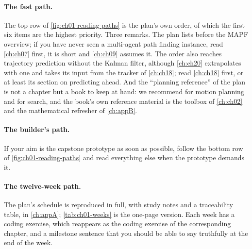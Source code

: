 \paragraph{The fast path.}
The top row of \cref{fig:ch01-reading-paths} is the plan's own order, of which the
first six items are the highest priority. Three remarks. The plan lists \cbs before the
MAPF overview; if you have never seen a multi-agent path finding
instance, read \cref{ch:ch07} first, it is short and \cref{ch:ch09} assumes it. The
order also reaches trajectory prediction without the Kalman filter, although
\cref{ch:ch20} extrapolates with one and takes its input from the tracker of
\cref{ch:ch18}; read \cref{ch:ch18} first, or at least its section on predicting ahead.
And the ``planning reference'' of the plan is not a chapter but a book to keep at hand: we
recommend \textcite{lavalle2006planning} for motion planning and
\textcite{russell2020aima} for search, and the book's own reference material is the
toolbox of \cref{ch:ch02} and the mathematical refresher of \cref{ch:appB}.

\paragraph{The builder's path.}
If your aim is the capstone prototype as soon as possible, follow the bottom row of
\cref{fig:ch01-reading-paths} and read everything else when the prototype demands it.

\paragraph{The twelve-week path.}
The plan's schedule is reproduced in full, with study notes and a traceability table,
in \cref{ch:appA}; \cref{tab:ch01-weeks} is the one-page version. Each week has a
coding exercise, which reappears as the coding exercise of the corresponding chapter,
and a milestone sentence that you should be able to say truthfully at the end of the
week.


